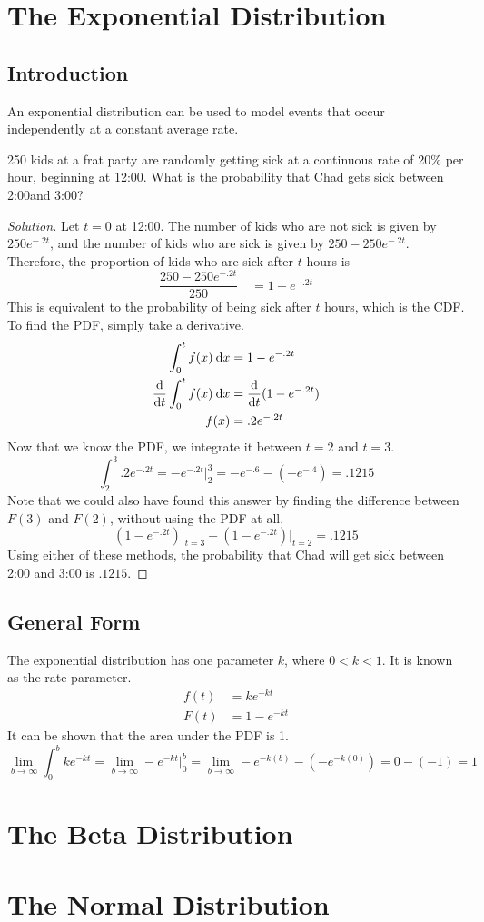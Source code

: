 \documentclass[11pt,leqno,letterpaper]{article}
\begin{document}
\section{The Exponential Distribution}
\subsection{Introduction}
An exponential distribution can be used to model events that occur
independently at a constant average rate.

\begin{mdframed}
\begin{problem}
250 kids at a frat party are randomly getting sick at a continuous
rate of 20\% per hour, beginning at 12:00\AM .
What is the probability that Chad gets sick between 2:00\AM{ }and 3:00\AM ?
\begin{proof}[Solution]
Let $t=0$ at 12:00\AM .
The number of kids who are not sick is given by $250e^{-.2t}$,
and the number of kids who are sick is given by
$250 - 250e^{-.2t}$.
Therefore, the proportion of kids who are sick after $t$ hours is
\[
\frac{250 - 250e^{-.2t}}{250} \quad = 1 - e^{-.2t}
\]
This is equivalent to the probability of being sick after $t$ hours,
which is the CDF. To find the PDF, simply take a derivative.
\begin{align*}
\int_0^t f(x) \:\mathrm{d}x &= 1 - e^{-.2t}\\
\frac{\mathrm{d}}{\mathrm{d}t} \int_0^t f(x) \:\mathrm{d}x &= \frac{\mathrm{d}}{\mathrm{d}t} (1 - e^{-.2t})\\
f(x) &= .2e^{-.2t}
\end{align*}
Now that we know the PDF, we integrate it between $t=2$ and $t=3$.
\[
\int_2^3 .2e^{-.2t} = -e^{-.2t}\Big|_2^3 = -e^{-.6} - (-e^{-.4})
= .1215
\]
Note that we could also have found this answer by
finding the difference between $F(3)$ and $F(2)$,
without using the PDF at all.
\[
\left(1 - e^{-.2t}\right)\Big|_{t=3} -
\left(1 - e^{-.2t}\right)\Big|_{t=2} = .1215
\]
Using either of these methods, the probability that Chad will get sick
between 2:00\AM{} and 3:00\AM{} is $.1215$.
\end{proof}
\end{problem}
\end{mdframed}
\subsection{General Form}
The exponential distribution has one parameter $k$,
where $0<k<1$. It is known as the rate parameter.
\begin{align*}
\tag{PDF}
f(t) &= ke^{-kt} \\
\tag{CDF}
F(t) &= 1-e^{-kt}
\end{align*}
It can be shown that the area under the PDF is 1.
\[
\lim_{b\to \infty} \int_0^b ke^{-kt} =
\lim_{b\to \infty} -e^{-kt}\bigg|_0^b =
\lim_{b\to \infty} -e^{-k(b)} - \left(-e^{-k(0)}\right) =
0 - (-1) = 1
\]
\section{The Beta Distribution}

\section{The Normal Distribution}
\end{document}
